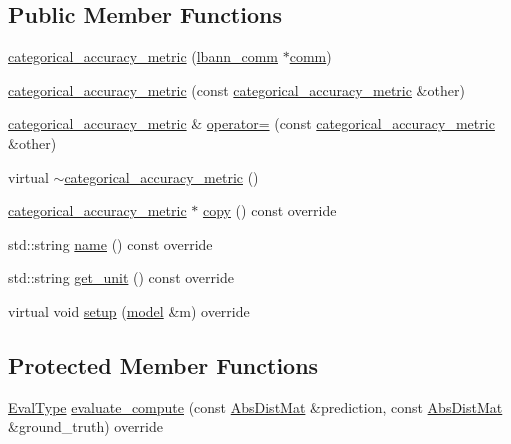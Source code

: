 \subsection*{Public Member Functions}
\begin{DoxyCompactItemize}
\item 
\hyperlink{classlbann_1_1categorical__accuracy__metric_ae7ea6f472bd6375780c49277742af9dc}{categorical\+\_\+accuracy\+\_\+metric} (\hyperlink{classlbann_1_1lbann__comm}{lbann\+\_\+comm} $\ast$\hyperlink{file__io_8cpp_ab048c6f9fcbcfaa57ce68b00263dbebe}{comm})
\item 
\hyperlink{classlbann_1_1categorical__accuracy__metric_a42d38fbdadc86de653cb5b251cf01eb7}{categorical\+\_\+accuracy\+\_\+metric} (const \hyperlink{classlbann_1_1categorical__accuracy__metric}{categorical\+\_\+accuracy\+\_\+metric} \&other)
\item 
\hyperlink{classlbann_1_1categorical__accuracy__metric}{categorical\+\_\+accuracy\+\_\+metric} \& \hyperlink{classlbann_1_1categorical__accuracy__metric_a859f8e13d7222c92e32b6751b194ef47}{operator=} (const \hyperlink{classlbann_1_1categorical__accuracy__metric}{categorical\+\_\+accuracy\+\_\+metric} \&other)
\item 
virtual \hyperlink{classlbann_1_1categorical__accuracy__metric_ade4c5123c0f6f979308dd012f8adc615}{$\sim$categorical\+\_\+accuracy\+\_\+metric} ()
\item 
\hyperlink{classlbann_1_1categorical__accuracy__metric}{categorical\+\_\+accuracy\+\_\+metric} $\ast$ \hyperlink{classlbann_1_1categorical__accuracy__metric_a46ce5b6eb09fecc8b0029fb62ba8cf66}{copy} () const override
\item 
std\+::string \hyperlink{classlbann_1_1categorical__accuracy__metric_a6fea8e495ab4ec4b05546c794468fa12}{name} () const override
\item 
std\+::string \hyperlink{classlbann_1_1categorical__accuracy__metric_a9c06851bc233a01b28c346a10d278d99}{get\+\_\+unit} () const override
\item 
virtual void \hyperlink{classlbann_1_1categorical__accuracy__metric_a328a63ccc21c31efd511445f5b060960}{setup} (\hyperlink{classlbann_1_1model}{model} \&m) override
\end{DoxyCompactItemize}
\subsection*{Protected Member Functions}
\begin{DoxyCompactItemize}
\item 
\hyperlink{base_8hpp_a3266f5ac18504bbadea983c109566867}{Eval\+Type} \hyperlink{classlbann_1_1categorical__accuracy__metric_a0ec8c3254569c9f9855675243ac51612}{evaluate\+\_\+compute} (const \hyperlink{base_8hpp_a9a697a504ae84010e7439ffec862b470}{Abs\+Dist\+Mat} \&prediction, const \hyperlink{base_8hpp_a9a697a504ae84010e7439ffec862b470}{Abs\+Dist\+Mat} \&ground\+\_\+truth) override
\end{DoxyCompactItemize}
